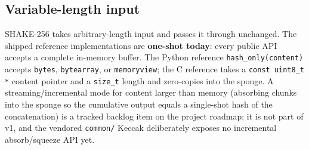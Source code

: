 \subsection{Variable-length input}

SHAKE-256 takes arbitrary-length input and \tesserahash{} passes it through unchanged. The shipped reference implementations are \textbf{one-shot today}: every public API accepts a complete in-memory buffer. The Python reference \texttt{hash\_only(content)} accepts \texttt{bytes}, \texttt{bytearray}, or \texttt{memoryview}; the C reference takes a \texttt{const uint8\_t *} content pointer and a \texttt{size\_t} length and zero-copies into the sponge. A streaming/incremental mode for content larger than memory (absorbing chunks into the sponge so the cumulative output equals a single-shot hash of the concatenation) is a tracked backlog item on the project roadmap; it is not part of v1, and the vendored \texttt{common/} Keccak deliberately exposes no incremental absorb/squeeze API yet.
